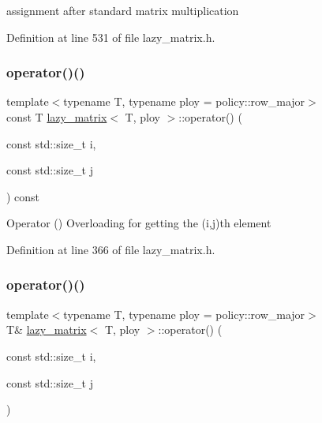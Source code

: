 assignment after standard matrix multiplication 



Definition at line 531 of file lazy\+\_\+matrix.\+h.

\mbox{\label{classlazy__matrix_a8d253d7fc183071a524232ad43f5afec}} 
\subsubsection{\texorpdfstring{operator()()}{operator()()}\hspace{0.1cm}{\footnotesize\ttfamily [1/2]}}
{\footnotesize\ttfamily template$<$typename T, typename ploy = policy\+::row\+\_\+major$>$ \\
const T \mbox{\hyperlink{classlazy__matrix}{lazy\+\_\+matrix}}$<$ T, ploy $>$\+::operator() (\begin{DoxyParamCaption}\item[{const std\+::size\+\_\+t}]{i,  }\item[{const std\+::size\+\_\+t}]{j }\end{DoxyParamCaption}) const\hspace{0.3cm}{\ttfamily [inline]}}

Operator () Overloading for getting the (i,j)th element 

Definition at line 366 of file lazy\+\_\+matrix.\+h.

\mbox{\label{classlazy__matrix_a43d4b192ebec1e2d246125be883d5a6e}} 
\subsubsection{\texorpdfstring{operator()()}{operator()()}\hspace{0.1cm}{\footnotesize\ttfamily [2/2]}}
{\footnotesize\ttfamily template$<$typename T, typename ploy = policy\+::row\+\_\+major$>$ \\
T\& \mbox{\hyperlink{classlazy__matrix}{lazy\+\_\+matrix}}$<$ T, ploy $>$\+::operator() (\begin{DoxyParamCaption}\item[{const std\+::size\+\_\+t}]{i,  }\item[{const std\+::size\+\_\+t}]{j }\end{DoxyParamCaption})\hspace{0.3cm}{\ttfamily [inline]}}



